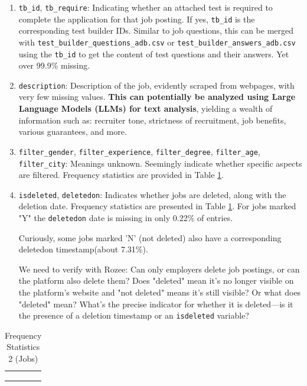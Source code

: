 \documentclass[12pt]{article}
\begin{document}
\begin{enumerate}
        
        \item \texttt{tb\_id}, \texttt{tb\_require}: Indicating whether an attached test is required to complete the application for that job posting. If yes, \texttt{tb\_id} is the corresponding test builder IDs. Similar to job questions, this can be merged with \texttt{test\_builder\_questions\_adb.csv} or \texttt{test\_builder\_answers\_adb.csv}  using the \texttt{tb\_id} to get the content of test questions and their answers. Yet over 99.9\% missing.



        
        \item \texttt{description}: Description of the job, evidently scraped from webpages, with very few missing values. \textbf{This can potentially be analyzed using Large Language Models (LLMs) for text analysis}, yielding a wealth of information such as: recruiter tone, strictness of recruitment, job benefits, various guarantees, and more.
        \item \texttt{filter\_gender}, \texttt{filter\_experience}, \texttt{filter\_degree}, \texttt{filter\_age}, \texttt{filter\_city}: Meanings unknown. Seemingly indicate whether specific aspects are filtered. Frequency statistics are provided in Table \ref{tab:jobs_freq2}.
        \item \texttt{isdeleted}, \texttt{deletedon}: Indicates whether jobs are deleted, along with the deletion date. Frequency statistics are presented in Table \ref{tab:jobs_freq2}.  For jobs marked "Y" the \texttt{deletedon} date is missing in only 0.22\% of entries.
        
        Curiously, some jobs marked 'N' (not deleted) also have a corresponding deletedon timestamp(about 7.31\%).


We need to verify with Rozee: Can only employers delete job postings, or can the platform also delete them? Does "deleted" mean it's no longer visible on the platform's website and "not deleted" means it's still visible? Or what does "deleted" mean? What's the precise indicator for whether it is deleted—is it the presence of a deletion timestamp or an \texttt{isdeleted} variable?

        
    \end{enumerate}


\begin{table}[]
    \centering
        \caption{Frequency Statistics 2 (Jobs)}
    \begin{tabular}{cccc}
\hline
\hline
\vspace{-0.4cm}
\\
 \\
\vspace{-1cm} \\
\hline 
\hline
    \end{tabular}
    \label{tab:jobs_freq2}
\end{table}
\end{document}
